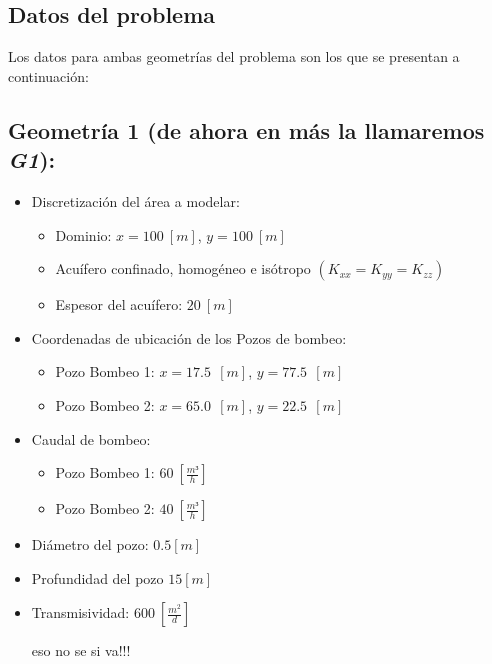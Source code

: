 \documentclass[10pt,a4paper,final]{article}
\begin{document}
\subsection{Datos del problema}
Los datos para ambas geometrías del problema son los que se presentan a continuación:
\label{datos_problema}
\subsection*{Geometría 1 (de ahora en más la llamaremos \emph{G1}): }
\label{geometria1}
\begin{itemize}
	\item Discretización del área a modelar:	
	\begin{itemize}
		\item Dominio: $x=100 ~\left[m\right]$, $y=100 ~\left[m\right]$
		\item Acuífero confinado, homogéneo e isótropo $(K_{xx} = K_{yy} = K_{zz})$
		\item Espesor del acuífero: $20 ~\left[m\right]$
	\end{itemize}
	\item Coordenadas de ubicación de los Pozos de bombeo:
	\begin{itemize}
		\item Pozo Bombeo 1: $x=17.5~~\left[m\right]$, $y=77.5 ~~\left[m\right]$
		\item Pozo Bombeo 2: $x=65.0~~\left[m\right]$, $y=22.5 ~~\left[m\right]$
	\end{itemize}
	\item Caudal de bombeo:
	\begin{itemize}
		\item Pozo Bombeo 1: $60~\left[\frac{m³}{h}\right]$
		\item Pozo Bombeo 2: $40~\left[\frac{m³}{h}\right]$
	\end{itemize}
	\item Diámetro del pozo: $0.5 [m]$
	\item Profundidad del pozo $15 [m]$
	\item Transmisividad: $600~\left[\frac{m^2}{d}\right]$ \begin{LARGE}
	eso no se si va!!!
	\end{LARGE}\\
\end{itemize}
%
\end{document}
